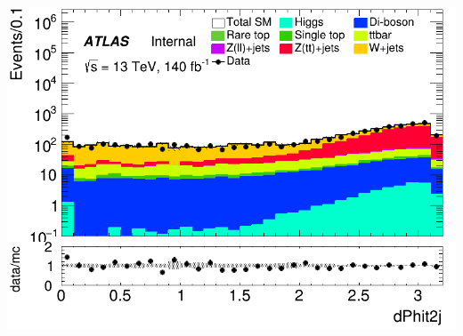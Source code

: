 \documentclass[usenames,dvipsnames]{beamer}
\begin{document}
\begin{frame}
\begin{minipage}{0.32\textwidth}
        \includegraphics[width=\textwidth]{graphics/H_met/H_met_dPhit2j.png}
    \end{minipage}
    
    \vspace{0.5cm} %


\end{frame}
\end{document}
